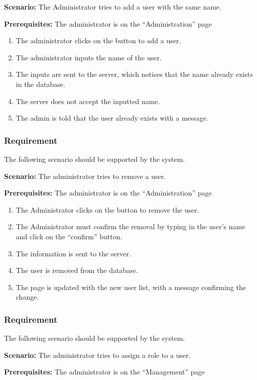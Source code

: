 \documentclass{article}
\begin{document}
\textbf{Scenario:} The Administrator tries to add a user with the same name.

\textbf{Prerequisites:} The administrator is on the “Administration” page

\begin{enumerate}
    \item The administrator clicks on the button to add a user.
    \item The administrator inputs the name of the user.
    \item The inputs are sent to the server, which notices that the name already exists in the database.
    \item The server does not accept the inputted name.
    \item The admin is told that the user already exists with a message.
\end{enumerate}

\subsubsection{Requirement}
The following scenario should be supported by the system.

\textbf{Scenario:} The administrator tries to remove a user.

\textbf{Prerequisites:} The administrator is on the “Administration” page

\begin{enumerate}
    \item The Administrator clicks on the button to remove the user.
    \item The Administrator must confirm the removal by typing in the user’s name and click on the “confirm” button.
    \item The information is sent to the server.
    \item The user is removed from the database.
    \item The page is updated with the new user list, with a message confirming the change.
\end{enumerate}

\subsubsection{Requirement}
The following scenario should be supported by the system.

\textbf{Scenario:} The administrator tries to assign a role to a user.

\textbf{Prerequisites:} The administrator is on the “Management” page
\end{document}

